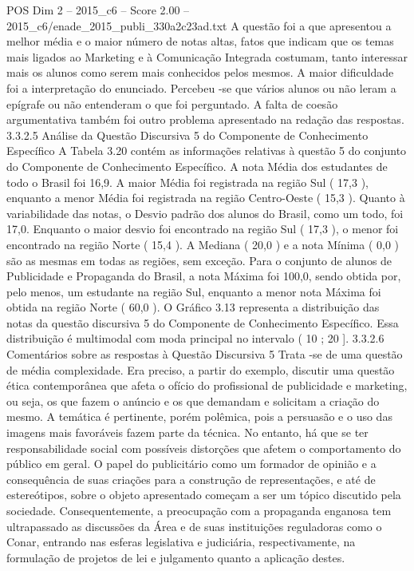 \begin{textsample}{POS Dim 2 – 2015\_c6 – Score 2.00 – 2015\_c6/enade\_2015\_publi\_330a2c23ad.txt}
A questão foi a que apresentou a melhor média e o maior número de notas altas, fatos que indicam que os temas mais ligados ao Marketing e à Comunicação Integrada costumam, tanto interessar mais os alunos como serem mais conhecidos pelos mesmos.
A maior dificuldade foi a interpretação do enunciado.
Percebeu -se que vários alunos ou não leram a epígrafe ou não entenderam o que foi perguntado.
A falta de coesão argumentativa também foi outro problema apresentado na redação das respostas. 3.3.2.5 Análise da Questão Discursiva 5 do Componente de Conhecimento Específico A Tabela 3.20 contém as informações relativas à questão 5 do conjunto do Componente de Conhecimento Específico.
A nota Média dos estudantes de todo o Brasil foi 16,9.
A maior Média foi registrada na região Sul ( 17,3 ), enquanto a menor Média foi registrada na região Centro-Oeste ( 15,3 ).
Quanto à variabilidade das notas, o Desvio padrão dos alunos do Brasil, como um todo, foi 17,0.
Enquanto o maior desvio foi encontrado na região Sul ( 17,3 ), o menor foi encontrado na região Norte ( 15,4 ).
A Mediana ( 20,0 ) e a nota Mínima ( 0,0 ) são as mesmas em todas as regiões, sem exceção.
Para o conjunto de alunos de Publicidade e Propaganda do Brasil, a nota Máxima foi 100,0, sendo obtida por, pelo menos, um estudante na região Sul, enquanto a menor nota Máxima foi obtida na região Norte ( 60,0 ).
O Gráfico 3.13 representa a distribuição das notas da questão discursiva 5 do Componente de Conhecimento Específico.
Essa distribuição é multimodal com moda principal no intervalo ( 10 ; 20 ]. 3.3.2.6 Comentários sobre as respostas à Questão Discursiva 5 Trata -se de uma questão de média complexidade.
Era preciso, a partir do exemplo, discutir uma questão ética contemporânea que afeta o ofício do profissional de publicidade e marketing, ou seja, os que fazem o anúncio e os que demandam e solicitam a criação do mesmo.
A temática é pertinente, porém polêmica, pois a persuasão e o uso das imagens mais favoráveis fazem parte da técnica.
No entanto, há que se ter responsabilidade social com possíveis distorções que afetem o comportamento do público em geral.
O papel do publicitário como um formador de opinião e a consequência de suas criações para a construção de representações, e até de estereótipos, sobre o objeto apresentado começam a ser um tópico discutido pela sociedade.
Consequentemente, a preocupação com a propaganda enganosa tem ultrapassado as discussões da Área e de suas instituições reguladoras como o Conar, entrando nas esferas legislativa e judiciária, respectivamente, na formulação de projetos de lei e julgamento quanto a aplicação destes.

\end{textsample}

